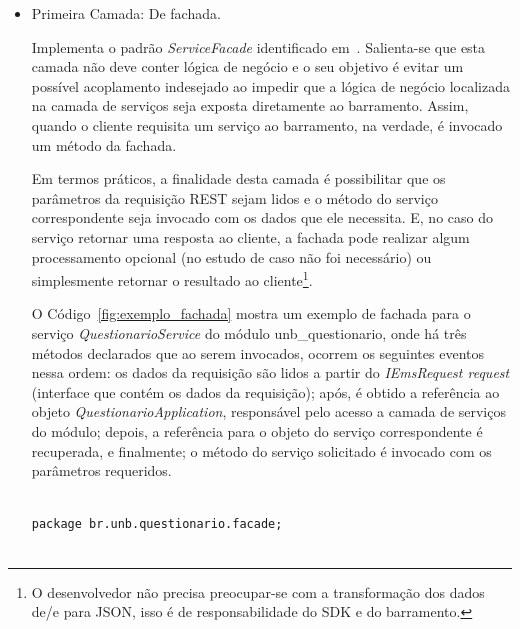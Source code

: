 \begin{itemize}

	\item Primeira Camada: De fachada.
	
	Implementa 
	o padrão \emph{ServiceFacade} 
	identificado em~\cite{SOA_patterns_2012}.
	Salienta-se que esta camada não deve 
	conter	lógica de negócio e 
	o seu objetivo é evitar 
	um possível acoplamento indesejado
	ao impedir que a lógica de negócio 
	localizada na camada de serviços
	seja exposta diretamente ao barramento.
	Assim, quando o cliente requisita um 
	serviço ao barramento,
	na verdade, é invocado um 
	método da fachada.

	Em termos práticos, a finalidade
	desta camada é possibilitar que 
	os parâmetros da requisição \acrshort{REST}
	sejam lidos e o método do serviço correspondente seja invocado
	com os dados que ele necessita. E, 
	no caso do serviço retornar
	uma resposta ao cliente, a fachada pode 
	realizar algum 
	processamento opcional (no estudo de caso não foi necessário)
	ou simplesmente retornar o 
	resultado ao cliente\footnote{O
	desenvolvedor não precisa preocupar-se 
	com a transformação dos dados de/e para \acrshort{JSON}, 
	isso é de responsabilidade do \acrshort{SDK} e do barramento.}.

	O Código~\ref{fig:exemplo_fachada} mostra um exemplo
	de fachada para o serviço \emph{QuestionarioService}
	do módulo unb\_questionario,
	onde há três métodos declarados que ao serem
	invocados, ocorrem os 
	seguintes eventos nessa ordem: 
	os dados da requisição
	são lidos a partir do \emph{IEmsRequest request}
	(interface que contém os dados da requisição); 
	após, é obtido a referência ao objeto \emph{QuestionarioApplication}, 
	responsável pelo acesso a camada de serviços do módulo; depois,
	a referência para o objeto do serviço correspondente é recuperada, 
	e finalmente; o método do serviço solicitado é invocado
	com os parâmetros requeridos.
	
	 
	
	
             
\renewcommand{\lstlistingname}{Código}             
\begin{lstlisting}[caption=Exemplo de fachada para o serviço QuestionarioService., label=fig:exemplo_fachada] 

package br.unb.questionario.facade;


\end{lstlisting}
\end{itemize}
